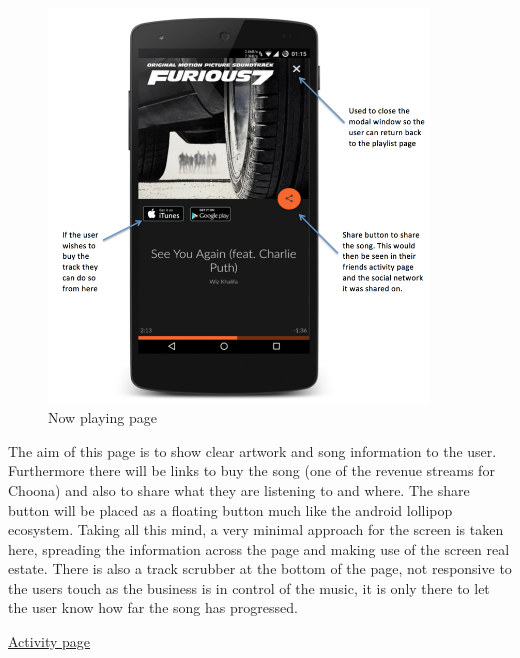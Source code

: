 \noindent
\begin{figure}[h!]
\centering
\includegraphics[width=0.9\textwidth]{./img/nowplayingannotated.png}
\caption{Now playing page}
\label{fig:nowplaying}
\end{figure}

The aim of this page is to show clear artwork and song information to the user. Furthermore there will be links to buy the song (one of the revenue streams for Choona) and also to share what they are listening to and where. The share button will be placed as a floating button much like the android lollipop ecosystem. Taking all this mind, a very minimal approach for the screen is taken here, spreading the information across the page and making use of the screen real estate. There is also a track scrubber at the bottom of the page, not responsive to the users touch as the business is in control of the music, it is only there to let the user know how far the song has progressed.   

\clearpage

\noindent\underline{Activity page}\newline

